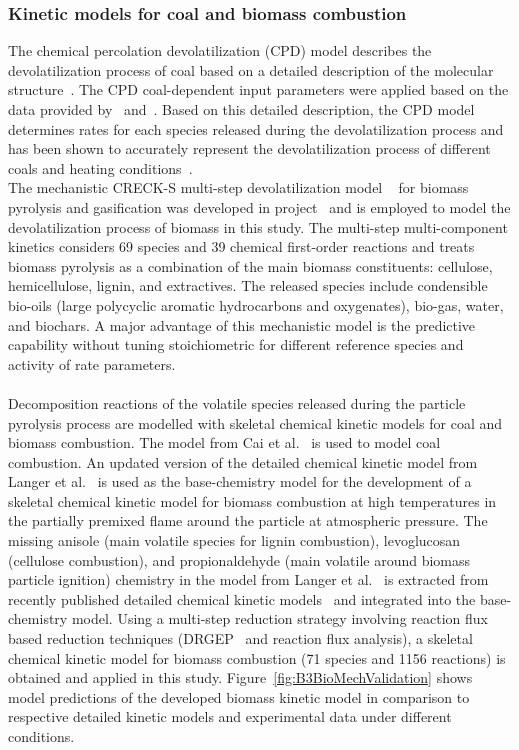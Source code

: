 \begin{btUnit}
\newpage
\subsubsection{Kinetic models for coal and biomass combustion}
The chemical percolation devolatilization (CPD) model describes the devolatilization process of coal based on a detailed description of the molecular structure~\cite{Grant1989}. The CPD coal-dependent input parameters were applied based on the data provided by~ and~. Based on this detailed description, the CPD model determines rates for each species released during the devolatilization process and has been shown to accurately represent the devolatilization process of different coals and heating conditions~\cite{Farmand2022}.
\\
The mechanistic CRECK-S multi-step devolatilization model ~\cite{Ranzi2008, Debiagi2015} for biomass pyrolysis and gasification was developed in project~ and is employed to model the devolatilization process of biomass in this study. The multi-step multi-component kinetics considers 69 species and 39 chemical first-order reactions and treats biomass pyrolysis as a combination of the main biomass constituents: cellulose, hemicellulose, lignin, and extractives. The released species include condensible bio-oils (large polycyclic aromatic hydrocarbons and oxygenates), bio-gas, water, and biochars. A major advantage of this mechanistic model is the predictive capability without tuning stoichiometric for different reference species and activity of rate parameters.
\\\\
Decomposition reactions of the volatile species released during the particle pyrolysis process are modelled with skeletal chemical kinetic models for coal and biomass combustion. The model from Cai et al.~\cite{Cai2021} is used to model coal combustion. An updated version of the detailed chemical kinetic model from Langer et al.~\cite{Langer2023} is used as the base-chemistry model for the development of a skeletal chemical kinetic model for biomass combustion at high temperatures in the partially premixed flame around the particle at atmospheric pressure. The missing anisole (main volatile species for lignin combustion), levoglucosan (cellulose combustion), and propionaldehyde (main volatile around biomass particle ignition) chemistry in the model from Langer et al.~\cite{Langer2023} is extracted from recently published detailed chemical kinetic models~\cite{Wagnon2018, Debiagi2016, Pelucchi2015} and integrated into the base-chemistry model. Using a multi-step reduction strategy involving reaction flux based reduction techniques (DRGEP~\cite{PepiotDesjardins2008} and reaction flux analysis), a skeletal chemical kinetic model for biomass combustion (71 species and 1156 reactions) is obtained and applied in this study. Figure~\ref{fig:B3BioMechValidation} shows model predictions of the developed biomass kinetic model in comparison to respective detailed kinetic models and experimental data under different conditions.

\end{btUnit}
